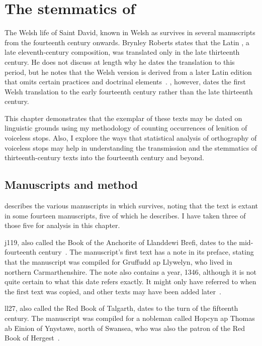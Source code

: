 \chapter{The stemmatics of }
\label{cha:stemm-mwbuch-dewi}
The Welsh life of Saint David, known in Welsh as  survives in several manuscripts from the fourteenth century onwards. Brynley Roberts states that the Latin , a late eleventh-century composition, was translated only in the late thirteenth century. He does not discuss at length why he dates the translation to this period, but he notes that the Welsh version is derived from a later Latin edition that omits certain practices and doctrinal elements~\autocite[218--219]{Rob_Ystoriaeu11}. \Textcite[liv]{Eva_Welsh88}, however, dates the first Welsh translation to the early fourteenth century rather than the late thirteenth century.

This chapter demonstrates that the exemplar of these texts may be dated on linguistic grounds using my methodology of counting occurrences of lenition of voiceless stops. Also, I explore the ways that statistical analysis of  orthography of voiceless stops may help in understanding the transmission and the stemmatics of thirteenth-century texts into the fourteenth century and beyond.



\section{Manuscripts and method}
\label{sec:manuscripts-1}

\Textcite[lv--lviii]{Eva_Welsh88} describes the various manuscripts in which  survives, noting that the text is extant in some fourteen manuscripts,  five of which he describes. I have taken three of those five for analysis in this chapter.

\Acrfull{j119}, also called the Book of the Anchorite of Llanddewi Brefi, dates to the mid-fourteenth century~\autocite[59]{huws_medieval_2000}. The manuscript's first text has a note in its preface, stating that the manuscript was compiled for Gruffudd ap Llywelyn, who lived in northern Carmarthenshire. The note also contains a year, 1346, although it is not quite certain to what this date refers exactly. It might only have referred to when the first text was copied, and other texts may have been added later~\autocite[lvi--lvii]{Eva_Welsh88}.

\Acrfull{ll27}, also called the Red Book of Talgarth, dates to the turn of the fifteenth century. The manuscript was compiled for a nobleman called Hopcyn ap Thomas ab Einion of Ynystawe, north of Swansea, who was also the patron of the Red Book of Hergest~\autocite[lvii]{Eva_Welsh88}.

